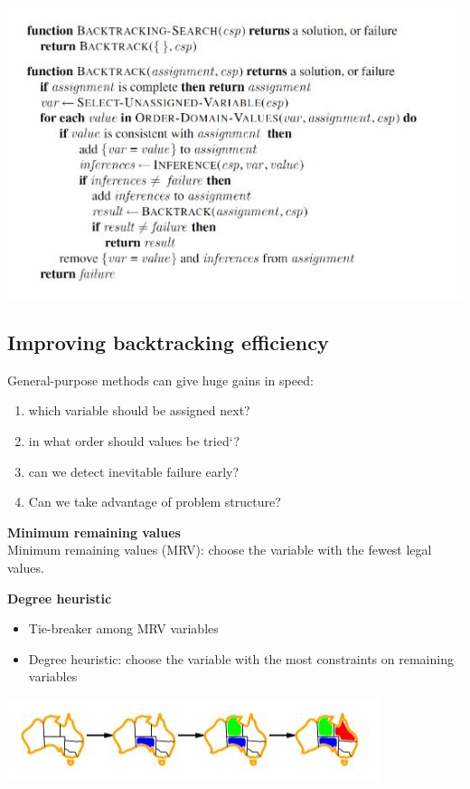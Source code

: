 \includegraphics[scale=1]{chap1_pics/backtrackcode.jpeg}
\subsection{Improving backtracking efficiency}
General-purpose methods can give huge gains in speed:\\
\begin{enumerate}
\item which variable should be assigned next?
\item in what order should values be tried`?
\item can we detect inevitable failure early?
\item Can we take advantage of problem structure? 
\end{enumerate}

\textbf{Minimum remaining values}\\
Minimum remaining values (MRV): choose the variable with the fewest legal values.

\textbf{Degree heuristic}\\
\begin{itemize}
\item Tie-breaker among MRV variables
\item Degree heuristic: choose the variable with the most constraints on remaining variables 
\end{itemize}
\includegraphics[scale=1]{chap1_pics/backtrack2.jpeg}

